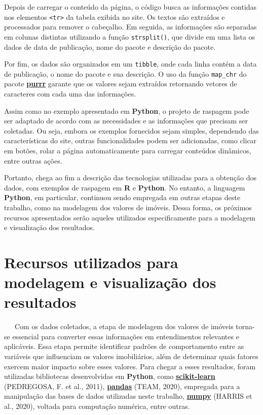 \documentclass[
  12pt,
  a4paper,
]{scrreprt}
\begin{document}
\vspace{12pt}

Depois de carregar o conteúdo da página, o código busca as informações
contidas nos elementos \texttt{\textless{}tr\textgreater{}} da tabela
exibida no site. Os textos são extraídos e processados para remover o
cabeçalho. Em seguida, as informações são separadas em colunas distintas
utilizando a função \texttt{strsplit()}, que divide em uma lista os
dados de data de publicação, nome do pacote e descrição do pacote.

\vspace{12pt}

Por fim, os dados são organizados em um \texttt{tibble}, onde cada linha
contém a data de publicação, o nome do pacote e sua descrição. O uso da
função \texttt{map\_chr} do pacote
\href{https://purrr.tidyverse.org/}{\textbf{purrr}} garante que os
valores sejam extraídos retornando vetores de caracteres com cada uma
das informações.

\vspace{12pt}

Assim como no exemplo apresentado em \textbf{Python}, o projeto de
raspagem pode ser adaptado de acordo com as necessidades e as
informações que precisam ser coletadas. Ou seja, embora os exemplos
fornecidos sejam simples, dependendo das características do site, outras
funcionalidades podem ser adicionadas, como clicar em botões, rolar a
página automaticamente para carregar conteúdos dinâmicos, entre outras
ações.

\vspace{12pt}

Portanto, chega ao fim a descrição das tecnologias utilizadas para a
obtenção dos dados, com exemplos de raspagem em \textbf{R} e
\textbf{Python}. No entanto, a linguagem \textbf{Python}, em particular,
continuou sendo empregada em outras etapas deste trabalho, como na
modelagem dos valores de imóveis. Dessa forma, os próximos recursos
apresentados serão aqueles utilizados especificamente para a modelagem e
visualização dos resultados.

\section{Recursos utilizados para modelagem e visualização dos
resultados}\label{recursos-utilizados-para-modelagem-e-visualizauxe7uxe3o-dos-resultados}

~~~Com os dados coletados, a etapa de modelagem dos valores de imóveis
torna-se essencial para converter essas informações em entendimentos
relevantes e aplicáveis. Essa etapa permite identificar padrões de
comportamento entre as variáveis que influenciam os valores
imobiliários, além de determinar quais fatores exercem maior impacto
sobre esses valores. Para chegar a esses resultados, foram utilizadas
bibliotecas desenvolvidas em \textbf{Python}, como
\href{https://scikit-learn.org/stable/}{\textbf{scikit-learn}}
(PEDREGOSA, F. et al., 2011),
\href{https://pandas.pydata.org/}{\textbf{pandas}} (TEAM, 2020),
empregada para a manipulação das bases de dados utilizadas neste
trabalho, \href{https://numpy.org/}{\textbf{numpy}} (HARRIS et al.,
2020), voltada para computação numérica, entre outras.
\end{document}
